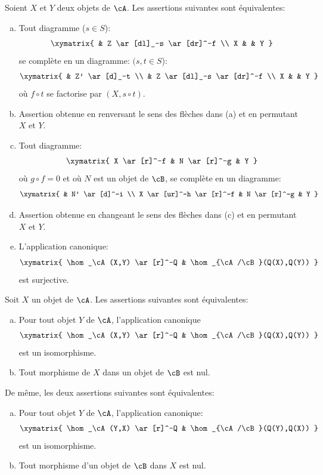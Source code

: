 \begin{proposition}\label{VIII:2-5-2}
Soient $X$ et $Y$ deux objets de $\cA$. Les assertions suivantes sont 
équivalentes: 
\begin{enumerate}[(a)]
  \item Tout diagramme ($s\in S$): 
    \[\xymatrix{
      & Z \ar[dl]_-s \ar[dr]^-f \\
      X 
        & & Y 
    }\]
    se complète en un diagramme: $(s,t\in S$): 
    \[\xymatrix{
      & Z' \ar[d]_-t \\
      & Z \ar[dl]_-s \ar[dr]^-f \\
      X 
        & & Y 
    }\]
    où $f\circ t$ se factorise par $(X,s\circ t)$. 
  \item Assertion obtenue en renversant le sens des flèches dans (a) et en 
    permutant $X$ et $Y$. 
  \item Tout diagramme: 
    \[\xymatrix{
      X \ar[r]^-f 
        & N \ar[r]^-g 
        & Y 
    }\]
    où $g\circ f=0$ et où $N$ est un objet de $\cB$, se complète en un 
    diagramme: 
    \[\xymatrix{
      & N' \ar[d]^-i \\
      X \ar[ur]^-h \ar[r]^-f 
        & N \ar[r]^-g 
        & Y 
    }\]
  \item Assertion obtenue en changeant le sens des flèches dans (c) et en 
    permutant $X$ et $Y$. 
  \item L'application canonique: 
    \[\xymatrix{
      \hom_\cA(X,Y) \ar[r]^-Q 
        & \hom_{\cA/\cB}(Q(X),Q(Y)) 
    }\]
    est surjective. 
\end{enumerate}
\end{proposition}





\begin{proposition}\label{VIII:2-5-3}
Soit $X$ un objet de $\cA$. Les assertions suivantes sont équivalentes: 
\begin{enumerate}[(a)]
  \item Pour tout objet $Y$ de $\cA$, l'application canonique 
    \[\xymatrix{
      \hom_\cA(X,Y) \ar[r]^-Q 
        & \hom_{\cA/\cB}(Q(X),Q(Y)) 
    }\]
    est un isomorphisme. 
  \item Tout morphisme de $X$ dans un objet de $\cB$ est nul. 
\end{enumerate}
De même, les deux assertions suivantes sont équivalentes: 
\begin{enumerate}[(a)']
  \item Pour tout objet $Y$ de $\cA$, l'application canonique: 
    \[\xymatrix{
      \hom_\cA(Y,X) \ar[r]^-Q 
        & \hom_{\cA/\cB}(Q(Y),Q(X)) 
    }\]
    est un isomorphisme. 
  \item Tout morphisme d'un objet de $\cB$ dans $X$ est nul. 
\end{enumerate}
\end{proposition}






